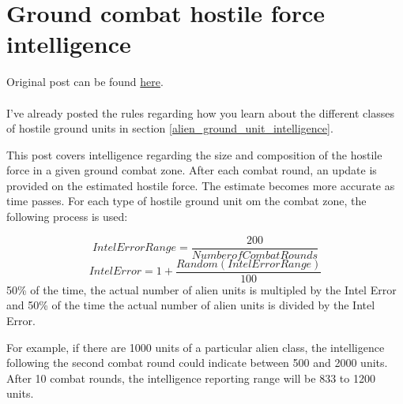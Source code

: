 \documentclass[../../Aurora C# unofficial manual.tex]{subfiles}
\begin{document}
	\section{Ground combat hostile force intelligence}
	Original post can be found
	\href{http://aurora2.pentarch.org/index.php?topic=8495.msg117706#msg117706}{here}.
	\\\\
	
	I've already posted the rules regarding how you learn about the different classes of hostile ground units in section \ref{alien_ground_unit_intelligence}.
	
	This post covers intelligence regarding the size and composition of the hostile force in a given ground combat zone. After each combat round, an update is provided on the estimated hostile force. The estimate becomes more accurate as time passes. For each type of hostile ground unit om the combat zone, the following process is used:
	
	\[ Intel Error Range = \frac{200}{Number of Combat Rounds} \]
	\[ Intel Error = 1 + \frac{Random (Intel Error Range)}{100} \]
	50\% of the time, the actual number of alien units is multipled by the Intel Error and 50\% of the time the actual number of alien units is divided by the Intel Error.
	
	For example, if there are 1000 units of a particular alien class, the intelligence following the second combat round could indicate between 500 and 2000 units. After 10 combat rounds, the intelligence reporting range will be 833 to 1200 units.
\end{document}

